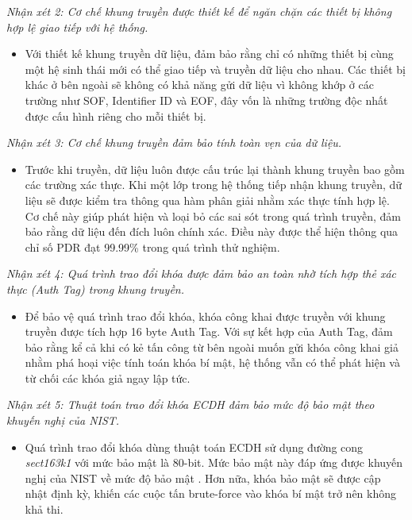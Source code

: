 \textit{Nhận xét 2: Cơ chế khung truyền được thiết kế để ngăn chặn các thiết bị không hợp lệ giao tiếp với hệ thống.}
\begin{itemize}
    \item Với thiết kế khung truyền dữ liệu, đảm bảo rằng chỉ có những thiết bị cùng một hệ sinh thái mới có thể giao tiếp và truyền dữ liệu cho nhau. Các thiết bị khác ở bên ngoài sẽ không có khả năng gửi dữ liệu vì không khớp ở các trường như SOF, Identifier ID và EOF, đây vốn là những trường độc nhất được cấu hình riêng cho mỗi thiết bị.
\end{itemize}

\textit{Nhận xét 3: Cơ chế khung truyền đảm bảo tính toàn vẹn của dữ liệu.}
\begin{itemize}
    \item Trước khi truyền, dữ liệu luôn được cấu trúc lại thành khung truyền bao gồm các trường xác thực. Khi một lớp trong hệ thống tiếp nhận khung truyền, dữ liệu sẽ được kiểm tra thông qua hàm phân giải nhằm xác thực tính hợp lệ. Cơ chế này giúp phát hiện và loại bỏ các sai sót trong quá trình truyền, đảm bảo rằng dữ liệu đến đích luôn chính xác. Điều này được thể hiện thông qua chỉ số PDR đạt 99.99\% trong quá trình thử nghiệm.
\end{itemize}

\textit{Nhận xét 4: Quá trình trao đổi khóa được đảm bảo an toàn nhờ tích hợp thẻ xác thực (Auth Tag) trong khung truyền.}
\begin{itemize}
    \item Để bảo vệ quá trình trao đổi khóa, khóa công khai được truyền với khung truyền được tích hợp 16 byte Auth Tag. Với sự kết hợp của Auth Tag, đảm bảo rằng kể cả khi có kẻ tấn công từ bên ngoài muốn gửi khóa công khai giả nhằm phá hoại việc tính toán khóa bí mật, hệ thống vẫn có thể phát hiện và từ chối các khóa giả ngay lập tức. 
\end{itemize}

\textit{Nhận xét 5: Thuật toán trao đổi khóa ECDH đảm bảo mức độ bảo mật theo khuyến nghị của NIST.}
\begin{itemize}
    \item Quá trình trao đổi khóa dùng thuật toán ECDH sử dụng đường cong \textit{sect163k1} với mức bảo mật là 80-bit. Mức bảo mật này đáp ứng được khuyến nghị của NIST về mức độ bảo mật \cite{nist}. Hơn nữa, khóa bảo mật sẽ được cập nhật định kỳ, khiến các cuộc tấn brute-force vào khóa bí mật trở nên không khả thi.
\end{itemize}

